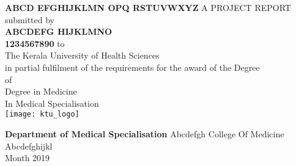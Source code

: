 \documentclass[12pt,a4paper]{report}
\def \reptitle{Abcd Efghijklmn Opq Rstuvwxyz}
\def \repauthor{ABCDEFG HIJKLMNO}
\def \repregno{1234567890}
\def \repdegree{Degree in Medicine}
\def \repbranch{Medical Specialisation}
\def \repcollege{Abcdefgh College Of Medicine}
\def \repplace{Abcdefghijkl}
\def \repuniversity{Kerala University of Health Sciences}
\def \repdate{Month 2019}
\begin{document}
\makeatletter
\renewcommand\chapter{\if@openright\cleardoublepage\else\clearpage\fi
                    \thispagestyle{empty}%
                    \global\@topnum\z@
                    \@afterindentfalse
                    \secdef\@chapter\@schapter}
\makeatother

\begin{titlepage}

\begin{center}
    \textbf{\MakeUppercase{ \Large \reptitle}}
    \vspace{.5 cm}
    \break
    A PROJECT REPORT \\
    submitted by\\
    \vspace{0.3 cm}
    \textbf{ \large \repauthor \\
    \repregno }
    \vspace{0.3 cm}
    to \\ The \repuniversity \\
    in partial fulfilment of the requirements for the award of the Degree \\
    of \\
    \repdegree \\
    In
    \repbranch \\
    \vspace{0.4 cm}
    \texttt{[image: ktu\_logo]}\par
    \vspace{0.5 cm}
    \textbf{\Large Department of \repbranch}
    \repcollege
    \break
    \repplace \\
    \repdate
    \vfill
\end{center}

\end{titlepage}


\end{document}
